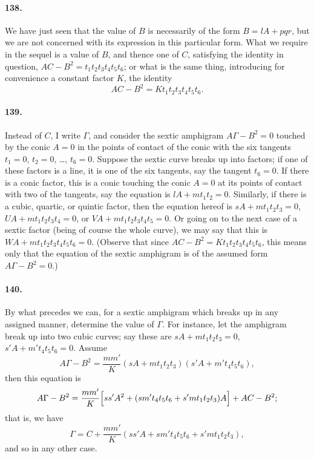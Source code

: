 \documentclass[11pt,a4paper]{article}
\begin{document}
\paragraph{138.}
We have just seen that the value of $B$ is necessarily of the form
$B = lA + pqr$, but we are not concerned with its expression in this
particular form. What we require in the sequel is a value of $B$, and
thence one of $C$, satisfying the identity in question,
$AC - B^2 = t_1 t_2 t_3 t_4 t_5 t_6$; or what is the same thing,
introducing for convenience a constant factor $K$, the identity
\[
AC - B^2 = K t_1 t_2 t_3 t_4 t_5 t_6.
\]

\paragraph{139.}
Instead of $C$, I write $\Gamma$, and consider the sextic amphigram
$A\Gamma - B^2 = 0$ touched by the conic $A = 0$ in the points of contact
of the conic with the six tangents $t_1 = 0$, $t_2 = 0$, \dots, $t_6 = 0$.
Suppose the sextic curve breaks up into factors; if one of these factors
is a line, it is one of the six tangents, say the tangent $t_6 = 0$. If
there is a conic factor, this is a conic touching the conic $A = 0$ at
its points of contact with two of the tangents, say the equation is
$lA + m t_1 t_2 = 0$. Similarly, if there is a cubic, quartic, or quintic
factor, then the equation hereof is $sA + m t_1 t_2 t_3 = 0$,
$UA + m t_1 t_2 t_3 t_4 = 0$, or $VA + m t_1 t_2 t_3 t_4 t_5 = 0$. Or going
on to the next case of a sextic factor (being of course the whole curve),
we may say that this is $WA + m t_1 t_2 t_3 t_4 t_5 t_6 = 0$. (Observe
that since $AC - B^2 = K t_1 t_2 t_3 t_4 t_5 t_6$, this means only that
the equation of the sextic amphigram is of the assumed form
$A\Gamma - B^2 = 0$.)

\paragraph{140.}
By what precedes we can, for a sextic amphigram which breaks up in any
assigned manner, determine the value of $\Gamma$. For instance, let the
amphigram break up into two cubic curves; say these are
$sA + m t_1 t_2 t_3 = 0$, $s'A + m' t_4 t_5 t_6 = 0$. Assume
\[
A\Gamma - B^2 = \frac{m m'}{K}(sA + m t_1 t_2 t_3)(s'A + m' t_4 t_5 t_6),
\]
then this equation is
\[
A\Gamma - B^2 = \frac{m m'}{K}\Bigl[ss'A^2
+ (s m' t_4 t_5 t_6 + s' m t_1 t_2 t_3) A\Bigr] + AC - B^2;
\]
that is, we have
\[
\Gamma = C + \frac{m m'}{K}(ss'A + s m' t_4 t_5 t_6 + s' m t_1 t_2 t_3),
\]
and so in any other case.
\end{document}
